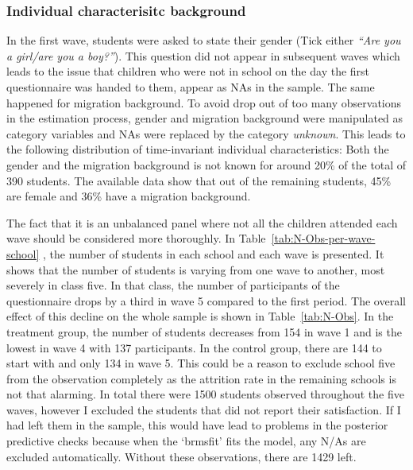 \documentclass[a4, 12pt]{article}
\begin{document}
\hypertarget{individual-characterisitc-background}{%
\subsubsection{Individual characterisitc background}\label{individual-characterisitc-background}}

In the first wave, students were asked to state their gender (Tick either \emph{``Are you a girl/are you a boy?''}). This question did not appear in subsequent waves which leads to the issue that children who were not in school on the day the first questionnaire was handed to them, appear as NAs in the sample. The same happened for migration background. To avoid drop out of too many observations in the estimation process, gender and migration background were manipulated as category variables and NAs were replaced by the category \emph{unknown}. This leads to the following distribution of time-invariant individual characteristics: Both the gender and the migration background is not known for around 20\% of the total of 390 students. The available data show that out of the remaining students, 45\% are female and 36\% have a migration background.

The fact that it is an unbalanced panel where not all the children attended each wave should be considered more thoroughly. In Table~\ref{tab:N-Obs-per-wave-school} , the number of students in each school and each wave is presented. It shows that the number of students is varying from one wave to another, most severely in class five. In that class, the number of participants of the questionnaire drops by a third in wave 5 compared to the first period. The overall effect of this decline on the whole sample is shown in Table~\ref{tab:N-Obs}. In the treatment group, the number of students decreases from 154 in wave 1 and is the lowest in wave 4 with 137 participants. In the control group, there are 144 to start with and only 134 in wave 5. This could be a reason to exclude school five from the observation completely as the attrition rate in the remaining schools is not that alarming. In total there were 1500 students observed throughout the five waves, however I excluded the students that did not report their satisfaction. If I had left them in the sample, this would have lead to problems in the posterior predictive checks because when the `brmsfit' fits the model, any N/As are excluded automatically. Without these observations, there are 1429 left.
\end{document}
